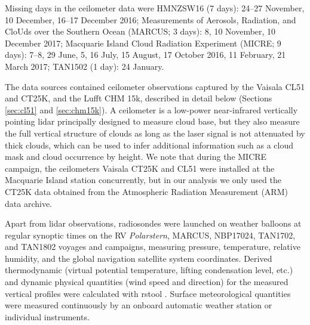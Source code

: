 \documentclass[draft]{agujournal2019}
\begin{document}
Missing days in the ceilometer data were HMNZSW16 (7 days): 24--27 November, 10
December, 16--17 December 2016; Measurements of Aerosols, Radiation, and CloUds
over the Southern Ocean (MARCUS;  3 days): 8, 10 November, 10 December 2017;
Macquarie Island Cloud Radiation Experiment (MICRE; 9 days): 7--8, 29 June, 5,
16 July, 15 August, 17 October 2016, 11 February, 21 March 2017; TAN1502 (1
day): 24 January.

The data sources contained ceilometer observations captured by the Vaisala CL51
and CT25K, and the Lufft CHM 15k, described in detail below (Sections
\ref{sec:cl51} and \ref{sec:chm15k}). A ceilometer is a low-power near-infrared
vertically pointing lidar principally designed to  measure cloud base, but they
also measure the full vertical structure of clouds as long as the laser signal
is not attenuated by thick clouds, which can be used to infer additional
information such as a cloud mask and cloud occurrence by height.  We note that
during the MICRE campaign, the ceilometers Vaisala CT25K and CL51 were
installed at the Macquarie Island station concurrently, but in our analysis we
only used the CT25K data obtained from the Atmospheric Radiation Measurement
(ARM) data archive.

Apart from lidar observations, radiosondes were launched on weather balloons at
regular synoptic times on the RV \emph{Polarstern}, MARCUS, NBP17024, TAN1702,
and TAN1802 voyages and campaigns, measuring pressure, temperature, relative
humidity, and the global navigation satellite system coordinates. Derived
thermodynamic (virtual potential temperature, lifting condensation level, etc.)
and dynamic physical quantities (wind speed and direction) for the measured
vertical profiles were calculated with rstool . Surface
meteorological quantities were measured continuously by an onboard automatic
weather station or individual instruments.
\end{document}
